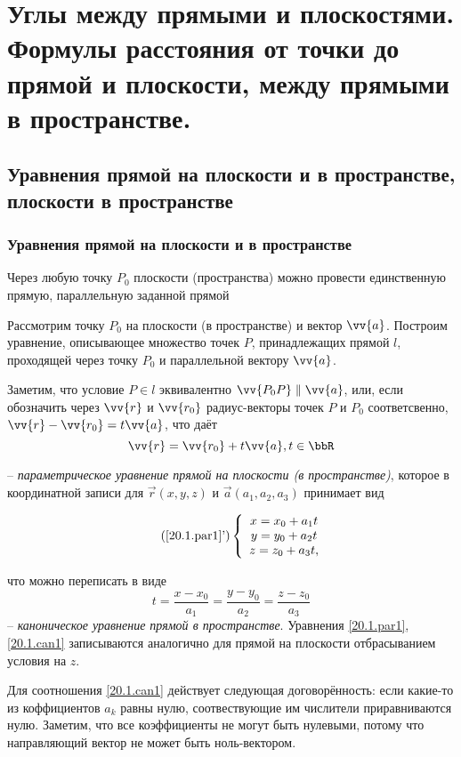 \chapter{Углы между прямыми и плоскостями. Формулы расстояния от точки до прямой и плоскости, между прямыми в пространстве.}
\section{Уравнения прямой на плоскости и в пространстве, плоскости в пространстве}
\subsection{Уравнения прямой на плоскости и в пространстве}
\begin{axiome} 
  Через любую точку $P_0$ плоскости (пространства) можно провести единственную прямую, параллельную заданной прямой
\end{axiome}
  Рассмотрим точку $P_0$ на плоскости (в пространстве) и вектор $\vv{a}$. Построим уравнение, описывающее множество точек $P$, принадлежащих прямой $l$, проходящей через точку $P_0$ и параллельной вектору $\vv{a}$.

  Заметим, что условие $P \in l$ эквивалентно $ \vv{P_0P} \parallel \vv{a} $, или, если обозначить через $\vv{r}$ и $\vv{r_0}$ радиус-векторы точек $P$ и $P_0$ соответсвенно, $\vv{r}-\vv{r_0} = t\vv{a}$, что даёт
\begin{equation}\label{20.1.par1}
\vv{r}=\vv{r_0}+t\vv{a}, t \in \bbR
\end{equation}

-- \textit{параметрическое уравнение прямой на плоскости (в пространстве)}, которое в координатной записи для $\overrightarrow{r}(x,y,z)$ и $\overrightarrow{a}(a_1,a_2,a_3)$ принимает вид

\begin{equation}\label{20.1.par2}\tag{\ref{20.1.par1}'}
  \left\lbrace\begin{array}{crl}
  x=x_0+a_1t\\
  y=y_0+a_2t\\
  z=z_0+a_3t,\\ 
  \end{array}\right.
\end{equation}

что можно переписать в виде
\begin{equation}\label{20.1.can1}
t=\frac{x-x_0}{a_1}=\frac{y-y_0}{a_2}=\frac{z-z_0}{a_3}
\end{equation}
-- \textit{каноническое уравнение прямой в пространстве}.
  Уравнения \ref{20.1.par1}, \ref{20.1.can1} записываются аналогично для прямой на плоскости отбрасыванием условия на $z$.
  \begin{notion}
  Для соотношения \ref{20.1.can1} действует следующая договорённость: если какие-то из коффициентов $a_k$ равны нулю, соотвествующие им числители приравниваются нулю. Заметим, что все коэффициенты не могут быть нулевыми, потому что направляющий вектор не может быть ноль-вектором.
  \end{notion}
  
